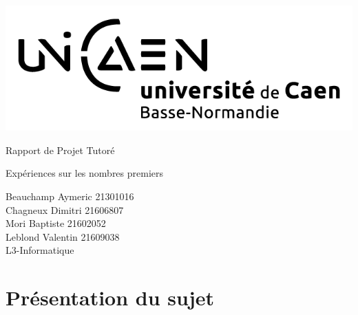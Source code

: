 \documentclass[a4paper,12pt]{article} %
\begin{document}


\begin{titlepage}

\includegraphics[scale=0.3]{images/unicaen.png}

\vspace{7cm}

\begin{center}

\begin{Huge}
Rapport de Projet Tutoré\\
\end{Huge}
\vspace{1cm}
\begin{huge}
Expériences sur les nombres premiers\\
\end{huge}
\vspace{2cm}
\begin{large}
Beauchamp Aymeric 21301016\\
Chagneux Dimitri 21606807\\
Mori Baptiste 21602052\\
Leblond Valentin 21609038\\
\vspace{1cm}
L3-Informatique
\end{large}

\end{center}
\end{titlepage}



\newpage

\tableofcontents

\newpage



\section*{Présentation du sujet}
\end{document}
